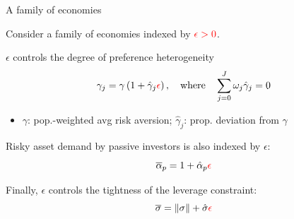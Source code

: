 \documentclass[12pt,aspectratio=169]{beamer}
\newenvironment{wideitemize}{\itemize\addtolength{\itemsep}{10pt}}{\enditemize}
\begin{document}
\begin{frame}{A family of economies}
    \begin{wideitemize}
        \item Consider a family of economies indexed by $\textcolor{red}{\epsilon>0}$.
        \item $\epsilon$ controls the degree of preference heterogeneity
        \[\gamma_{j}=\gamma\left(1+\hat{\gamma}_{j} \textcolor{red}{\epsilon}\right), \quad\text{where}\quad \sum_{j=0}^{J} \omega_{j} \hat{\gamma}_{j}=0\]
        \vspace{-2mm}
        \begin{itemize}
            \item $\gamma$: pop.-weighted avg risk aversion; $\hat{\gamma}_j$: prop. deviation from $\gamma$
        \end{itemize}
        \item Risky asset demand by passive investors is also indexed by $\epsilon$:
        \[\overline{\alpha}_p = 1 + \hat{\alpha}_p \textcolor{red}{\epsilon}\]
        \item Finally, $\epsilon$ controls the tightness of the leverage constraint:
        \[\overline{\sigma}=\|\sigma\|+\hat{\sigma}\textcolor{red}{\epsilon}\]
    \end{wideitemize}
\end{frame}
\end{document}
